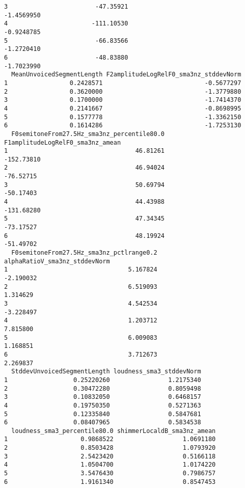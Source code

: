 \documentclass[
  letterpaper,
  DIV=11,
  numbers=noendperiod]{scrartcl}
\begin{document}
\begin{verbatim}
3                        -47.35921                            -1.4569950
4                       -111.10530                            -0.9248785
5                        -66.83566                            -1.2720410
6                        -48.83880                            -1.7023990
  MeanUnvoicedSegmentLength F2amplitudeLogRelF0_sma3nz_stddevNorm
1                 0.2428571                            -0.5677297
2                 0.3620000                            -1.3779880
3                 0.1700000                            -1.7414370
4                 0.2141667                            -0.8698995
5                 0.1577778                            -1.3362150
6                 0.1614286                            -1.7253130
  F0semitoneFrom27.5Hz_sma3nz_percentile80.0 F1amplitudeLogRelF0_sma3nz_amean
1                                   46.81261                       -152.73810
2                                   46.94024                        -76.52715
3                                   50.69794                        -50.17403
4                                   44.43988                       -131.68280
5                                   47.34345                        -73.17527
6                                   48.19924                        -51.49702
  F0semitoneFrom27.5Hz_sma3nz_pctlrange0.2 alphaRatioV_sma3nz_stddevNorm
1                                 5.167824                     -2.190032
2                                 6.519093                      1.314629
3                                 4.542534                     -3.228497
4                                 1.203712                      7.815800
5                                 6.009083                      1.168851
6                                 3.712673                      2.269837
  StddevUnvoicedSegmentLength loudness_sma3_stddevNorm
1                  0.25220260                1.2175340
2                  0.30472280                0.8059498
3                  0.10832050                0.6468157
4                  0.19750350                0.5271363
5                  0.12335840                0.5847681
6                  0.08407965                0.5834538
  loudness_sma3_percentile80.0 shimmerLocaldB_sma3nz_amean
1                    0.9868522                   1.0691180
2                    0.8503428                   1.0793920
3                    2.5423420                   0.5166118
4                    1.0504700                   1.0174220
5                    3.5476430                   0.7986757
6                    1.9161340                   0.8547453

\end{verbatim}
\end{document}
